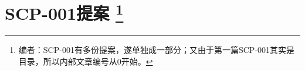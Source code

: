 \part[SCP-001提案]{
	SCP-001提案
	\protect\footnote{编者\QIS ：SCP-001有多份提案，遂单独成一部分；又由于第一篇SCP-001其实是目录，所以内部文章编号从0开始。}
}

\setcounter{chapter}{-1}





































